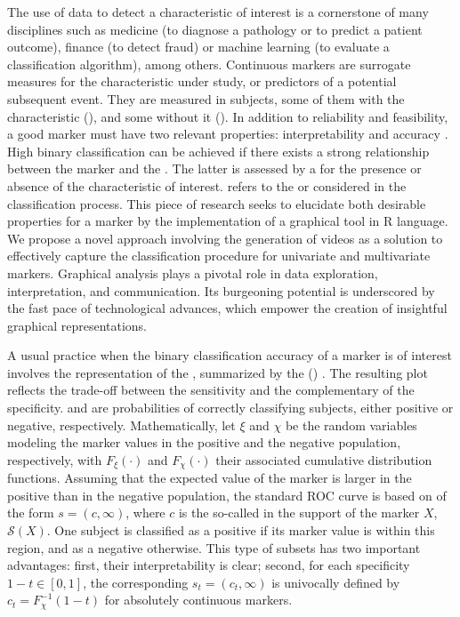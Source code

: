 The use of data to detect a characteristic of interest is a cornerstone of many disciplines such as medicine (to diagnose a pathology or to predict a patient outcome), finance (to detect fraud) or machine learning (to evaluate a classification algorithm), among others. Continuous markers are surrogate measures for the characteristic under study, or predictors of a potential subsequent event. They are measured in subjects, some of them with the characteristic (), and some without it (). In addition to reliability and feasibility, a good marker must have two relevant properties: interpretability and accuracy \citep{Mayeux2004}. High binary classification  can be achieved if there exists a strong relationship between the marker and the . The latter is assessed by a  for the presence or absence of the characteristic of interest.  refers to the  or  considered in the classification process. This piece of research seeks to elucidate both desirable properties for a marker by the implementation of a graphical tool in R language. We propose a novel approach involving the generation of videos as a solution to effectively capture the classification procedure for univariate and multivariate markers. Graphical analysis plays a pivotal role in data exploration, interpretation, and communication. Its burgeoning potential is underscored by the fast pace of technological advances, which empower the creation of insightful graphical representations.

A usual practice when the binary classification accuracy of a marker is of interest involves the representation of the , summarized by the  () \citep{Hanley1982}. The resulting plot reflects the trade-off between the sensitivity and the complementary of the specificity.  and  are probabilities of correctly classifying subjects, either positive or negative, respectively. Mathematically, let $\xi$ and $\chi$ be the random variables modeling the marker values in the positive and the negative population, respectively, with $F_\xi(\cdot)$ and $F_\chi(\cdot)$ their associated cumulative distribution functions. Assuming that the expected value of the marker is larger in the positive than in the negative population, the standard ROC curve is based on  of the form $s = (c, \infty)$, where $c$ is the so-called  in the support of the marker $X$, $\mathcal{S}(X)$. One subject is classified as a positive if its marker value is within this region, and as a negative otherwise. This type of subsets has two important advantages: first, their interpretability is clear; second, for each specificity $1-t \in [0,1]$, the corresponding $s_t = (c_t, \infty)$ is univocally defined by $c_t = F_\chi^{-1}(1-t)$ for absolutely continuous markers.


